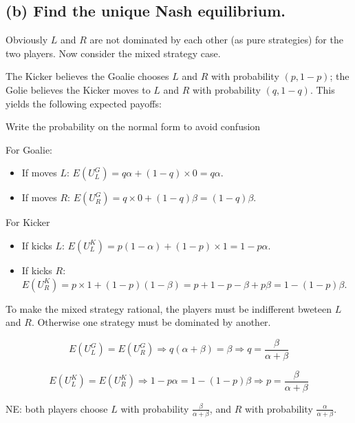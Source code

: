 \documentclass{article}
\begin{document}
\subsection*{(b) Find the unique Nash equilibrium.}

\begin{mdframed}[backgroundcolor=blue!20,linecolor=white]
Obviously $L$ and $R$ are not dominated by each other (as pure strategies) for the two players. Now consider the 
mixed strategy case.
\end{mdframed}

The Kicker believes the Goalie chooses $L$ and $R$ with probability $(p, 1-p)$; the Golie believes the Kicker moves to $L$ and $R$ with probability $(q, 1-q)$. This yields the following expected payoffs:

\begin{mdframed}[backgroundcolor=yellow!20,linecolor=white]
Write the probability on the normal form to avoid confusion
\end{mdframed}


For Goalie:
\begin{itemize}
\item If moves $L$: $E(U^G_L)= q \alpha + (1-q) \times 0 = q \alpha$.
\item If moves $R$: $E(U^G_R)=q \times 0 + (1-q) \beta =(1-q) \beta$.
\end{itemize}

For Kicker
\begin{itemize}
\item If kicks $L$: $E(U^K_L) = p (1-\alpha) + (1-p)\times 1 = 1 - p\alpha$.
\item If kicks $R$: $E(U^K_R) = p\times 1 + (1-p)(1-\beta) = p + 1 - p - \beta + p\beta = 1 - (1-p)\beta$.
\end{itemize}

\begin{mdframed}[backgroundcolor=blue!20,linecolor=white]
To make the mixed strategy rational, the players must be indifferent bweteen $L$ and $R$. Otherwise one strategy must be
dominated by another.
\end{mdframed}


$$E(U^G_L) = E(U^G_R) \Rightarrow  q(\alpha+\beta) = \beta \Rightarrow q=\frac{\beta}{\alpha+\beta}$$
 
$$E(U^K_L) = E(U^K_R) \Rightarrow 1- p\alpha = 1-(1-p)\beta \Rightarrow p = \frac{\beta}{\alpha+\beta}$$

 
NE: both players choose $L$ with probability $\tfrac{\beta}{\alpha + \beta}$, and $R$ with probability $\tfrac{\alpha}{\alpha + \beta}$. 
\end{document}
